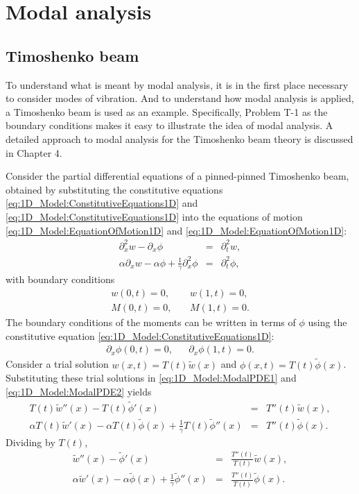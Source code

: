 \documentclass[../../main.tex]{subfiles}
\begin{document}
\section{Modal analysis}\label{sec:existence:ModalAnalysis}
\subsection{Timoshenko beam}\label{subsec:Timoshenko_Modal_Analsis}
To understand what is meant by modal analysis, it is in the first place necessary to consider modes of vibration. And to understand how modal analysis is applied, a Timoshenko beam is used as an example. Specifically, Problem T-1 as the boundary conditions makes it easy to illustrate the idea of modal analysis. A detailed approach to modal analysis for the Timoshenko beam theory is discussed in Chapter 4.


Consider the partial differential equations of a pinned-pinned Timoshenko beam, obtained by substituting the constitutive equations \eqref{eq:1D_Model:ConstitutiveEquations1D} and \eqref{eq:1D_Model:ConstitutiveEquations1D} into the equations of motion \eqref{eq:1D_Model:EquationOfMotion1D} and \eqref{eq:1D_Model:EquationOfMotion1D}:
\begin{eqnarray}
	  \partial^2_{x} w - \partial_{x}\phi &=& \partial^{2}_{t} w, \label{eq:1D_Model:ModalPDE1}\\
	  \alpha\partial_{x} w - \alpha\phi + \frac{1}{\gamma}\partial^2_{x}\phi &=&  \partial^{2}_{t} \phi,\label{eq:1D_Model:ModalPDE2}
\end{eqnarray}
with boundary conditions
\begin{eqnarray*} 
	w(0,t) = 0, & &	\	 w(1,t) = 0, \label{eq:1D_Model:ModalBC1}\\
	M(0,t) = 0, & &	\	M(1,t) = 0. \label{eq:1D_Model:ModalBC2}
\end{eqnarray*}
The boundary conditions of the moments can be written in terms of $\phi$ using the constitutive equation \eqref{eq:1D_Model:ConstitutiveEquations1D}:
\begin{eqnarray*}
	\partial_{x}\phi(0,t) = 0, & & \partial_{x}\phi(1,t) = 0. \label{MA_4}
\end{eqnarray*}
Consider a trial solution $w(x,t) = T(t)\tilde{w}(x)$ and $\phi(x,t) = T(t)\tilde{\phi}(x)$. Substituting these trial solutions in \eqref{eq:1D_Model:ModalPDE1} and \eqref{eq:1D_Model:ModalPDE2} yields
\begin{eqnarray*}
	T(t)\tilde{w}''(x) - T(t)\tilde{\phi}'(x) &=& T''(t)\tilde{w}(x),\\
	  \alpha T(t)\tilde{w}'(x) - \alpha T(t)\tilde{\phi}(x) + \frac{1}{\gamma}T(t)\tilde{\phi}''(x) &=&  T''(t)\tilde{\phi}(x).
\end{eqnarray*}
Dividing by $T(t)$,
\begin{eqnarray*}
	\tilde{w}''(x) - \tilde{\phi}'(x) &=& \frac{T''(t)}{T(t)}\tilde{w}(x),\\
	  \alpha \tilde{w}'(x) - \alpha \tilde{\phi}(x) + \frac{1}{\gamma}\tilde{\phi}''(x) &=&  \frac{T''(t)}{T(t)}\tilde{\phi}(x).
\end{eqnarray*}
\end{document}
